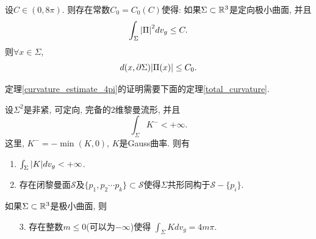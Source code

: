 \begin{theorem} \label{curvature_estimate_4pi}
    设$C \in (0,8\pi)$. 则存在常数$C_0=C_0(C)$使得: 如果$\Sigma \subset {\mathbb{R}}^3$是定向极小曲面, 并且
    \begin{equation}
        \int_\Sigma {\left | {\Pi}\right |}^2 dv_g \le C.
    \end{equation}
    则$\forall x \in \Sigma$,
    \begin{equation}
        d(x,{\partial} \Sigma){\left | {\Pi}(x) \right |} \le C_0.
    \end{equation}
\end{theorem}
定理\eqref{curvature_estimate_4pi}的证明需要下面的定理\eqref{total_curvature}.
\begin{theorem}\label{total_curvature}
    设$\Sigma^2$是非紧, 可定向, 完备的2维黎曼流形, 并且
    \begin{equation}
        \int_\Sigma K^- < +\infty. 
    \end{equation}
    这里, $K^-=-\min(K,0)$, $K$是Gauss曲率. 则有
    \begin{enumerate}
        \item $\int_\Sigma {\left | K \right |} dv_g < +\infty$.
        \item 存在闭黎曼面$\mathcal{S}$及$\{p_1,p_2\cdots p_k\} \subset \mathcal{S}$使得$\Sigma$共形同构于$\mathcal{S}-\{p_i\}$.
    \end{enumerate}
    如果$\Sigma \subset {\mathbb{R}}^3$是极小曲面, 则
    \begin{enumerate}
        \item[3.] 存在整数$m \le 0$(可以为$-\infty$)使得 $\int_\Sigma K dv_g = 4m\pi$.
    \end{enumerate}
\end{theorem}
